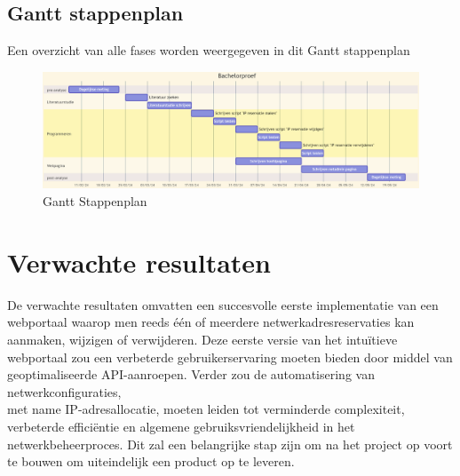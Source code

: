 \documentclass{hogent-article}
\begin{document}
\subsection{Gantt stappenplan}
Een overzicht van alle fases worden weergegeven in dit Gantt stappenplan
\begin{figure}[h!]
    \includegraphics[scale=0.21]{Gantt}
    \caption{Gantt Stappenplan}
    \label{Gantt Stappenplan}
\end{figure}


\section{Verwachte resultaten}
\label{sec:verwachte-resultaten}
De verwachte resultaten omvatten een succesvolle eerste implementatie van een webportaal waarop men reeds één of meerdere netwerkadresreservaties kan aanmaken, wijzigen of verwijderen. Deze eerste versie van het intuïtieve webportaal zou een verbeterde gebruikerservaring moeten bieden door middel van geoptimaliseerde API-aanroepen. Verder zou de automatisering van netwerkconfiguraties, \\met name IP-adresallocatie, moeten leiden tot verminderde complexiteit, verbeterde efficiëntie en algemene gebruiksvriendelijkheid in het netwerkbeheerproces. Dit zal een belangrijke stap zijn om na het project op voort te bouwen om uiteindelijk een product op te leveren.
\end{document}
